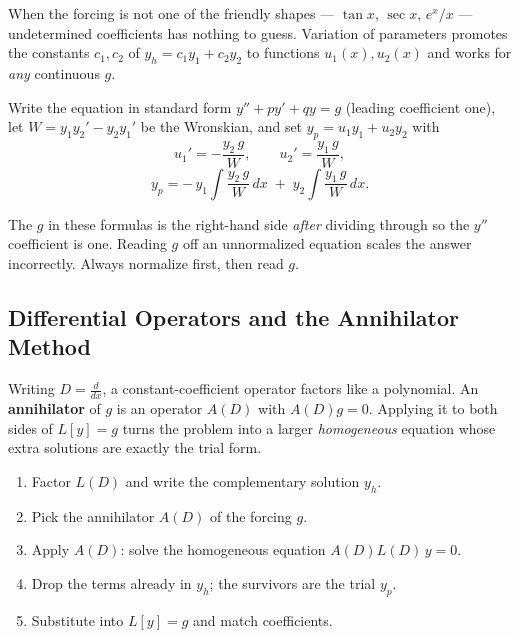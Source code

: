 When the forcing is not one of the friendly shapes --- $\tan x$, $\sec x$,
$e^x/x$ --- undetermined coefficients has nothing to guess. Variation of
parameters promotes the constants $c_1,c_2$ of $y_h = c_1 y_1 + c_2 y_2$ to
functions $u_1(x),u_2(x)$ and works for \emph{any} continuous $g$.

\begin{formulabox}
Write the equation in standard form $y'' + p y' + q y = g$ (leading coefficient
one), let $W = y_1 y_2' - y_2 y_1'$ be the Wronskian, and set $y_p = u_1 y_1 + u_2 y_2$ with
\[ u_1' = -\frac{y_2\, g}{W}, \qquad u_2' = \frac{y_1\, g}{W}, \]
\[ y_p = -\,y_1\!\int \frac{y_2\, g}{W}\,dx \;+\; y_2\!\int \frac{y_1\, g}{W}\,dx. \]
\end{formulabox}

\begin{warningbox}
The $g$ in these formulas is the right-hand side \emph{after} dividing through so
the $y''$ coefficient is one. Reading $g$ off an unnormalized equation scales the
answer incorrectly. Always normalize first, then read $g$.
\end{warningbox}

\subsection{Differential Operators and the Annihilator Method}

Writing $D = \tfrac{d}{dx}$, a constant-coefficient operator factors like a
polynomial. An \textbf{annihilator} of $g$ is an operator $A(D)$ with $A(D)g = 0$.
Applying it to both sides of $L[y]=g$ turns the problem into a larger
\emph{homogeneous} equation whose extra solutions are exactly the trial form.

\begin{methodbox}
\begin{enumerate}[leftmargin=1.6em, itemsep=2pt]
    \item Factor $L(D)$ and write the complementary solution $y_h$.
    \item Pick the annihilator $A(D)$ of the forcing $g$.
    \item Apply $A(D)$: solve the homogeneous equation $A(D)L(D)\,y = 0$.
    \item Drop the terms already in $y_h$; the survivors are the trial $y_p$.
    \item Substitute into $L[y]=g$ and match coefficients.
\end{enumerate}
\end{methodbox}

